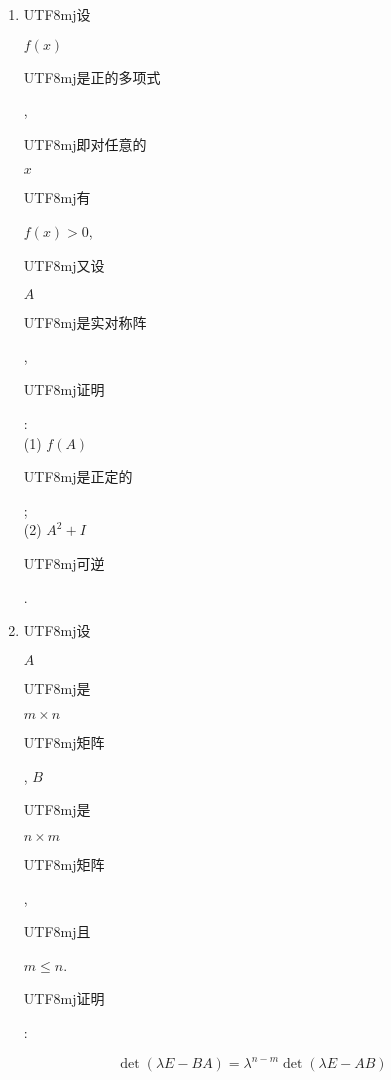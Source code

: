 \documentclass[10pt]{article}
\begin{document}
\begin{enumerate}
  \item \begin{CJK}{UTF8}{mj}设\end{CJK} $f(x)$ \begin{CJK}{UTF8}{mj}是正的多项式\end{CJK}, \begin{CJK}{UTF8}{mj}即对任意的\end{CJK} $x$ \begin{CJK}{UTF8}{mj}有\end{CJK} $f(x)>0$, \begin{CJK}{UTF8}{mj}又设\end{CJK} $A$ \begin{CJK}{UTF8}{mj}是实对称阵\end{CJK}, \begin{CJK}{UTF8}{mj}证明\end{CJK}:\\
(1) $f(A)$ \begin{CJK}{UTF8}{mj}是正定的\end{CJK};\\
(2) $A^{2}+I$ \begin{CJK}{UTF8}{mj}可逆\end{CJK}.

  \item \begin{CJK}{UTF8}{mj}设\end{CJK} $A$ \begin{CJK}{UTF8}{mj}是\end{CJK} $m \times n$ \begin{CJK}{UTF8}{mj}矩阵\end{CJK}, $B$ \begin{CJK}{UTF8}{mj}是\end{CJK} $n \times m$ \begin{CJK}{UTF8}{mj}矩阵\end{CJK}, \begin{CJK}{UTF8}{mj}且\end{CJK} $m \leq n$. \begin{CJK}{UTF8}{mj}证明\end{CJK}:

\end{enumerate}
$$
\operatorname{det}(\lambda E-B A)=\lambda^{n-m} \operatorname{det}(\lambda E-A B)
$$
\end{document}
